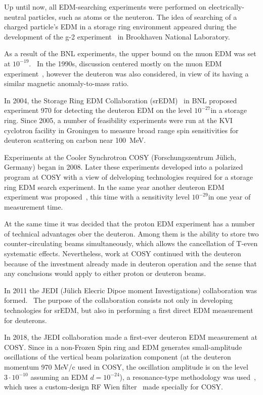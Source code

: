 Up until now, all EDM-searching experiments were performed on electrically-neutral particles, such as
atoms or the neuteron. The idea of searching of a charged particle's EDM in a storage ring environment
appeared during the development of the g-2 experiment~\cite{BNL:g-2:2001} in Brookhaven National Laboratory.

As a result of the BNL experiments, the upper bound on the muon EDM was set at
$10^{-19}$\ecm.~\cite{BNL:muon_ANA:2009} In the 1990s, discussion centered mostly on the
muon EDM experiment~\cite{Farley:SREDM:Muon}, however the deuteron was also considered, in view of its having
a similar magnetic anomaly-to-mass ratio.

In 2004, the Storage Ring EDM Collaboration (srEDM)~\cite{BNL:SREDM} in BNL proposed experiment 970
for detecting the deuteron EDM on the level $10^{-27}$\ecm in a storage ring. Since 2005, a number of feasibility
experiments were run at the KVI cyclotron facility in Groningen to measure broad range spin sensitivities
for deuteron scattering on carbon near 100~MeV.

Experiments at the Cooler Synchrotron COSY (Forschungszentrum J\"ulich, Germany) began in 2008. Later
these experiments developed into a polarized program at COSY with a view of delveloping technologies required
for a storage ring EDM search experiment. In the same year another deuteron EDM experiment was
proposed~\cite{BNL:Deuteron2008}, this time with a sensitivity level $10^{-29}$\ecm in one year of measurement
time.

At the same time it was decided that the proton EDM experiment has a number of technical advantages
ober the deuteron. Among them is the ability to store two counter-circulating beams simultaneously,
which allows the cancellation of T-even systematic effects. Nevertheless, work at COSY continued with
the deuteron because of the investment already made in deuteron operation and the sense that any conclusions would apply to either proton or deuteron beams.~\cite[\textbf{Historical background}]{YellowReport}

In 2011 the JEDI (J\"ulich Elecric Dipoe moment Investigations) collaboration was formed.~\cite{JEDI:Website}
The purpose of the collaboration consists not only in developing technologies for srEDM, but also in
performing a first direct EDM measurement for deuterons.

In 2018, the JEDI collaboration made a first-ever deuteron EDM measurement at COSY. 
Since in a non-Frozen Spin ring
and EDM generates small-amplitude oscillations of the vertical beam polarization component
(at the deuteron momentum 970 MeV/c used in COSY, the oscillation amplitude is on the level $3\cdot10^{-10}$
assuming an EDM $d = 10^{-24}$\ecm), a resonance-type methodology
was used~\cite{COSY:Partially-Frozen-Spin, COSY:SpinTuneMapping}, which uses a custom-design
RF Wien filter~\cite{JSlim:RFWF:Design, JSlim:RFWF:Commisioning} made specially for COSY.

